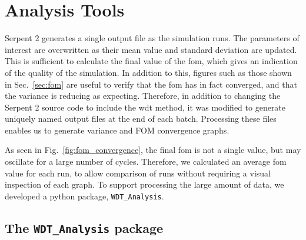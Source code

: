 \section{Analysis Tools}
\label{sec:analysis}

Serpent 2 generates a single output file as the simulation runs. The
parameters of interest are overwritten as their mean value and
standard deviation are updated. This is sufficient to calculate the
final value of the \gls{fom}, which gives an indication of the quality
of the simulation. In addition to this, figures such as those shown in
Sec.~\ref{sec:fom} are useful to verify that the \gls{fom} has in fact
converged, and that the variance is reducing as expecting. Therefore,
in addition to changing the Serpent 2 source code to include the
\gls{wdt} method, it was modified to generate uniquely named output
files at the end of each batch. Processing these files enables us to
generate variance and FOM convergence graphs.

As seen in Fig.~\ref{fig:fom_convergence}, the final \gls{fom} is not
a single value, but may oscillate for a large number of
cycles. Therefore, we calculated an average \gls{fom} value for each
run, to allow comparison of runs without requiring a visual inspection
of each graph. To support processing the large amount of data, we
developed a python package, \verb|WDT_Analysis|.

\subsection{The \texttt{WDT\_Analysis} package}
\label{sec:wdt_analysis}

